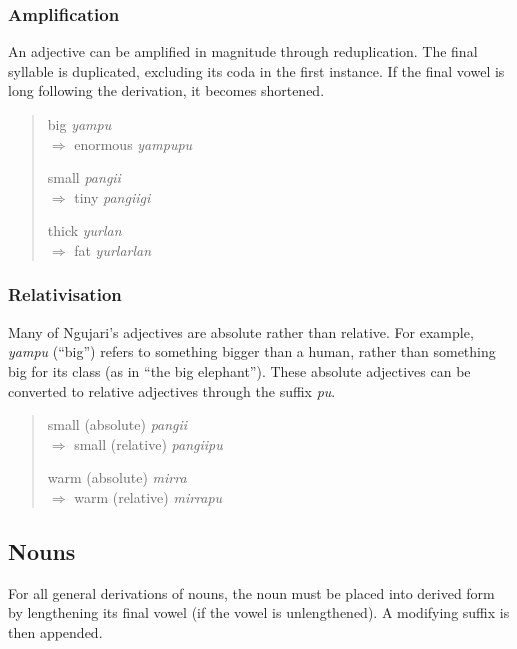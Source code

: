 \subsubsection{Amplification}

An adjective can be amplified in magnitude through reduplication. The final
syllable is duplicated, excluding its coda in the first instance. If the final
vowel is long following the derivation, it becomes shortened.

\begin{quote}
\begin{multicols}{3}
big \textit{yampu}\\
$\Rightarrow$ enormous \textit{yampupu}

small \textit{pangii}\\
$\Rightarrow$ tiny \textit{pangiigi}

thick \textit{yurlan}\\
$\Rightarrow$ fat \textit{yurlarlan}
\end{multicols}
\end{quote}

\subsubsection{Relativisation}

Many of Ngujari's adjectives are absolute rather than relative. For example,
\textit{yampu} (``big'') refers to something bigger than a human, rather than
something big for its class (as in ``the big elephant''). These absolute
adjectives can be converted to relative adjectives through the suffix
\textit{pu}.

\begin{quote}
\begin{multicols}{2}
small (absolute) \textit{pangii}\\
$\Rightarrow$ small (relative) \textit{pangiipu}

warm (absolute) \textit{mirra}\\
$\Rightarrow$ warm (relative) \textit{mirrapu}
\end{multicols}
\end{quote}

\subsection{Nouns}

For all general derivations of nouns, the noun must be placed into derived form by lengthening its final vowel (if the vowel is unlengthened). A modifying suffix is then appended.

